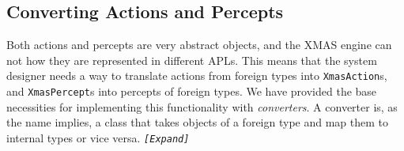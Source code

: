 
\subsection{Converting Actions and Percepts}

Both actions and percepts are very abstract objects, and the XMAS
engine can not how they are represented in different APLs. This means
that the system designer needs a way to translate actions from foreign
types into \texttt{XmasAction}s, and \texttt{XmasPercept}s into percepts
of foreign types. We have provided the base necessities for implementing
this functionality with \emph{converters}. A converter is, as the
name implies, a class that takes objects of a foreign type and map
them to internal types or vice versa. \texttt{\emph{{[}Expand{]}}}
